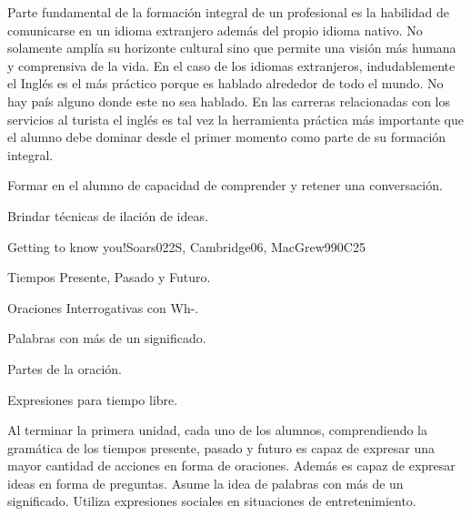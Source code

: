 \begin{syllabus}


\begin{justification}
Parte fundamental de la formación integral de un profesional es la habilidad de comunicarse en un idioma extranjero además del propio idioma nativo. No solamente amplí­a su horizonte cultural sino que permite una visión más humana y comprensiva de la vida. En el caso de los idiomas extranjeros, indudablemente el Inglés es el 
más práctico porque es hablado alrededor de todo el mundo. No hay paí­s alguno donde este no sea hablado. En las carreras relacionadas con los servicios al turista el inglés es tal vez la herramienta práctica más importante que el alumno debe dominar desde el primer momento como parte de su formación integral.
\end{justification}

\begin{goals}
\item Formar en el alumno de capacidad de comprender y retener una conversación.
\item Brindar técnicas de ilación de ideas.
\end{goals}

\begin{outcomes}
\item {}
\end{outcomes}

\begin{competences}
\item {}
\end{competences}

\begin{unit}{Getting to know you!}{}{Soars022S, Cambridge06, MacGrew99}{0}{C25}
   \begin{topics}
      \item Tiempos Presente, Pasado y Futuro.
      \item Oraciones Interrogativas con Wh-.
      \item Palabras con más de un significado.
      \item Partes de la oración.
      \item Expresiones para tiempo libre.
   \end{topics}

   \begin{learningoutcomes}
      \item Al terminar la primera unidad, cada uno de los alumnos, comprendiendo la gramática de los tiempos presente, pasado y futuro es capaz de expresar una mayor cantidad de acciones en forma de oraciones.  Además es capaz de expresar ideas en forma de preguntas.  Asume la idea de palabras con más de un significado. Utiliza expresiones sociales en situaciones de entretenimiento. 
   \end{learningoutcomes}
\end{unit}


\end{syllabus}

